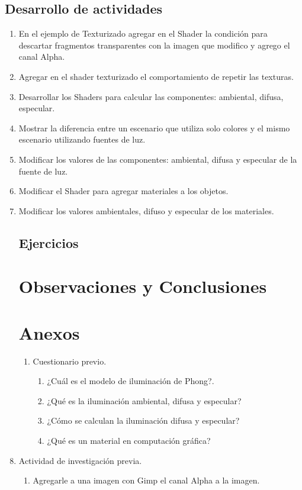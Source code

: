 \documentclass[11pt, english]{article}
\begin{document}
\subsection{Desarrollo de actividades}
\begin{enumerate}
\item En el ejemplo de Texturizado agregar en el Shader la condición para descartar
fragmentos transparentes con la imagen que modifico y agrego el canal Alpha.
\item Agregar en el shader texturizado el comportamiento de repetir las texturas.
\item Desarrollar los Shaders para calcular las componentes: ambiental, difusa,
especular.
\item Mostrar la diferencia entre un escenario que utiliza solo colores y el mismo
escenario utilizando fuentes de luz.
\item Modificar los valores de las componentes: ambiental, difusa y especular de la
fuente de luz.
\item Modificar el Shader para agregar materiales a los objetos.
\item Modificar los valores ambientales, difuso y especular de los materiales.

\subsection{Ejercicios}
\section{Observaciones y Conclusiones}
\section{Anexos}
\begin{enumerate}
\item Cuestionario previo.
\begin{enumerate}
\item ¿Cuál es el modelo de iluminación de Phong?.
\item ¿Qué es la iluminación ambiental, difusa y especular?
\item ¿Cómo se calculan la iluminación difusa y especular?
\item ¿Qué es un material en computación gráfica?
\end{enumerate}
\end{enumerate}
\item Actividad de investigación previa.
\begin{enumerate}
\item Agregarle a una imagen con Gimp el canal Alpha a la imagen.
\end{enumerate}
\end{enumerate}

\end{document}
